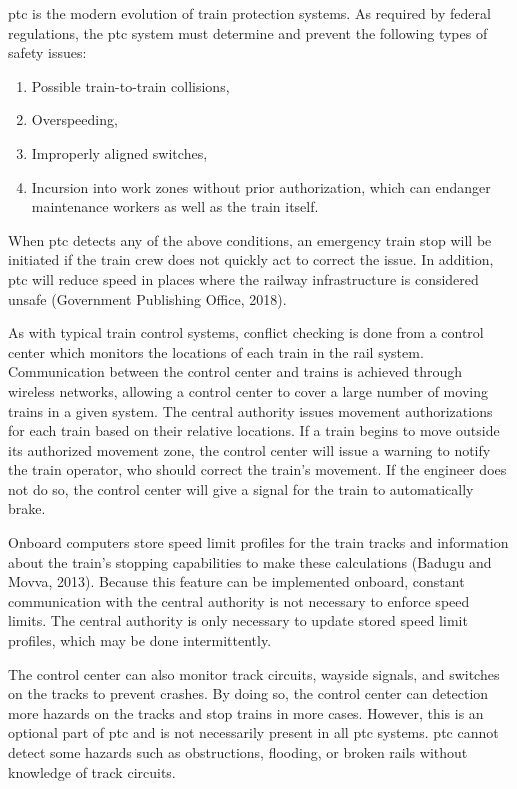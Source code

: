 \documentclass[11pt, titlepage]{article}
\begin{document}
\gls{ptc} is the modern evolution of train protection systems. As required by
federal regulations, the \gls{ptc} system must determine and prevent the following
types of safety issues:
\begin{enumerate}
    \item Possible train-to-train collisions,
    \item Overspeeding,
    \item Improperly aligned switches,
    \item Incursion into work zones without prior authorization, which can endanger
    maintenance workers as well as the train itself.
\end{enumerate}
When \gls{ptc} detects any of the above conditions, an emergency train stop will be
initiated if the train crew does not quickly act to correct the issue. In addition,
\gls{ptc} will reduce speed in places where the railway infrastructure is
considered unsafe (Government Publishing Office, 2018).

As with typical train control systems, conflict checking is done from a control
center which monitors the locations of each train in the rail system. Communication
between the control center and trains is achieved through wireless networks,
allowing a control center to cover a large number of moving trains in a given
system. The central authority issues movement authorizations for each train based
on their relative locations. If a train begins to move outside its authorized
movement zone, the control center will issue a warning to notify the train
operator, who should correct the train’s movement. If the engineer does not do so,
the control center will give a signal for the train to automatically brake.

Onboard computers store speed limit profiles for the train tracks and information
about the train’s stopping capabilities to make these calculations (Badugu and Movva, 2013).
Because this feature can be implemented onboard, constant communication with the
central authority is not necessary to enforce speed limits. The central authority
is only necessary to update stored speed limit profiles, which may be done
intermittently.

The control center can also monitor track circuits, wayside signals, and switches
on the tracks to prevent crashes. By doing so, the control center can detection
more hazards on the tracks and stop trains in more cases. However, this is an
optional part of \gls{ptc} and is not necessarily present in all \gls{ptc} systems.
\gls{ptc} cannot detect some hazards such as obstructions, flooding, or broken
rails without knowledge of track circuits.
\end{document}

